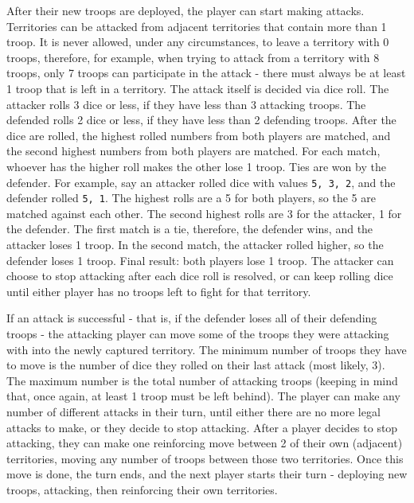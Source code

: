 After their new troops are deployed, the player can start making attacks. Territories can be attacked from adjacent territories that contain more than 1 troop. It is never allowed, under any circumstances, to leave a territory with 0 troops, therefore, for example, when trying to attack from a territory with 8 troops, only 7 troops can participate in the attack - there must always be at least 1 troop that is left in a territory. The attack itself is decided via dice roll. The attacker rolls 3 dice or less, if they have less than 3 attacking troops. The defended rolls 2 dice or less, if they have less than 2 defending troops. After the dice are rolled, the highest rolled numbers from both players are matched, and the second highest numbers from both players are matched. For each match, whoever has the higher roll makes the other lose 1 troop. Ties are won by the defender. For example, say an attacker rolled dice with values \texttt{5, 3, 2}, and the defender rolled \texttt{5, 1}. The highest rolls are a 5 for both players, so the 5 are matched against each other. The second highest rolls are 3 for the attacker, 1 for the defender. The first match is a tie, therefore, the defender wins, and the attacker loses 1 troop. In the second match, the attacker rolled higher, so the defender loses 1 troop. Final result: both players lose 1 troop. The attacker can choose to stop attacking after each dice roll is resolved, or can keep rolling dice until either player has no troops left to fight for that territory.

If an attack is successful - that is, if the defender loses all of their defending troops - the attacking player can move some of the troops they were attacking with into the newly captured territory. The minimum number of troops they have to move is the number of dice they rolled on their last attack (most likely, 3). The maximum number is the total number of attacking troops (keeping in mind that, once again, at least 1 troop must be left behind). The player can make any number of different attacks in their turn, until either there are no more legal attacks to make, or they decide to stop attacking. After a player decides to stop attacking, they can make one reinforcing move between 2 of their own (adjacent) territories, moving any number of troops between those two territories. Once this move is done, the turn ends, and the next player starts their turn - deploying new troops, attacking, then reinforcing their own territories.

